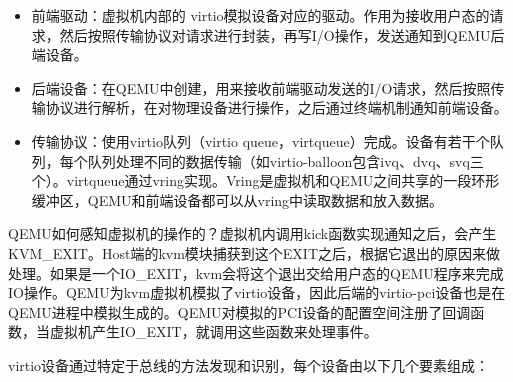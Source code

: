 \begin{itemize}
	\item 前端驱动：虚拟机内部的 virtio模拟设备对应的驱动。作用为接收用户态的请求，然后按照传输协议对请求进行封装，再写I/O操作，发送通知到QEMU后端设备。
	\item 后端设备：在QEMU中创建，用来接收前端驱动发送的I/O请求，然后按照传输协议进行解析，在对物理设备进行操作，之后通过终端机制通知前端设备。
	\item 传输协议：使用virtio队列（virtio queue，virtqueue）完成。设备有若干个队列，每个队列处理不同的数据传输（如virtio-balloon包含ivq、dvq、svq三个）。virtqueue通过vring实现。Vring是虚拟机和QEMU之间共享的一段环形缓冲区，QEMU和前端设备都可以从vring中读取数据和放入数据。
\end{itemize}


QEMU如何感知虚拟机的操作的？虚拟机内调用kick函数实现通知之后，会产生KVM\_EXIT。Host端的kvm模块捕获到这个EXIT之后，根据它退出的原因来做处理。如果是一个IO\_EXIT，kvm会将这个退出交给用户态的QEMU程序来完成IO操作。QEMU为kvm虚拟机模拟了virtio设备，因此后端的virtio-pci设备也是在QEMU进程中模拟生成的。QEMU对模拟的PCI设备的配置空间注册了回调函数，当虚拟机产生IO\_EXIT，就调用这些函数来处理事件。

virtio设备通过特定于总线的方法发现和识别，每个设备由以下几个要素组成：

